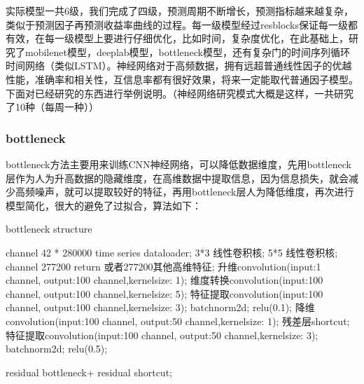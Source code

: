 \documentclass[11pt]{ctexart}
\begin{document}
实际模型一共6级，我们完成了四级，预测周期不断增长，预测指标越来越复杂，类似于预测因子再预测收益率曲线的过程。每一级模型经过resblocks保证每一级都有效，在每一级模型上要进行仔细优化，比如时间，复杂度优化，在此基础上，研究了mobilenet模型，deeplab模型，bottleneck模型，还有复杂门的时间序列循环时间网络（类似LSTM）。神经网络对于高频数据，拥有远超普通线性因子的优越性能，准确率和相关性，互信息率都有很好效果，将来一定能取代普通因子模型。下面对已经研究的东西进行举例说明。（神经网络研究模式大概是这样，一共研究了10种（每周一种））

\subsubsection{bottleneck}
bottleneck方法主要用来训练CNN神经网络，可以降低数据维度，先用bottleneck层作为人为升高数据的隐藏维度，在高维数据中提取信息，因为信息损失，就会减少高频噪声，就可以提取较好的特征，再用bottleneck层人为降低维度，再次进行模型简化，很大的避免了过拟合，算法如下：
\renewcommand{\algorithmicrequire}{\textbf{Input:}}  %
\renewcommand{\algorithmicensure}{\textbf{Output:}} %
  \begin{algorithm}[htb]
  \caption{bottleneck structure}
  \label{alg:Framwork}
  \begin{algorithmic}[1]
     channel 42 * 280000 time series dataloader;
      3*3 线性卷积核;
      5*5 线性卷积核;
     channel 277200 return 或者277200其他高维特征;
    \State 升维convolution(input:1 channel, output:100 channel,kernelsize: 1);
    \label{code:fram:extract}
    \State 维度转换convolution(input:100 channel, output:100 channel,kernelsize: 5);
    \label{code:fram:trainbase}
    \State 特征提取convolution(input:100 channel, output:100 channel,kernelsize: 3);
    \label{code:fram:trainbase}
    \State batchnorm2d;
    \label{code:fram:trainbase}
    \State relu(0.1);
    \label{code:fram:select}
    \State 降维convolution(input:100 channel, output:50 channel,kernelsize: 1);
    \label{code:fram:decrease}
    \State 残差层shortcut;
    \label{code:fram:residual}
    \State 特征提取convolution(input:100 channel, output:50 channel,kernelsize: 3);
    \label{code:fram:residual}
    \State batchnorm2d;
    \label{code:fram:residual}
    \State relu(0.5);
    \label{code:fram:residual}

    \Return residual bottleneck+ residual shortcut;
  \end{algorithmic}
\end{algorithm}
\end{document}
